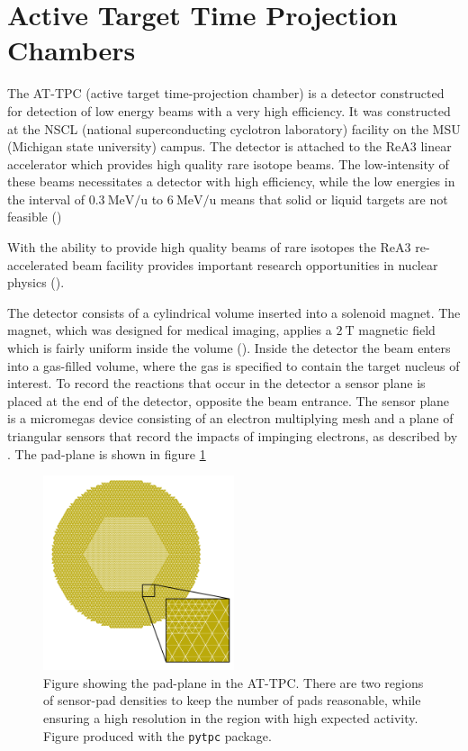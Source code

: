 \section{Active Target Time Projection Chambers}\label{sec:attpc}

The AT-TPC (active target time-projection chamber) is a detector constructed for detection of low energy beams with a very high efficiency. It was constructed at the NSCL (national superconducting cyclotron laboratory) facility on the MSU (Michigan state university) campus. The detector is attached to the ReA3 linear accelerator which provides high quality rare isotope beams. The low-intensity of these beams necessitates a detector with high efficiency, while the low energies in the interval of $\SI[per-mode=symbol]{0.3}{\MeV \per \atomicmassunit}$ to $\SI[per-mode=symbol]{6}{\MeV \per \atomicmassunit}$ means that solid or liquid targets are not feasible (\cite{Bradt2017a})

 With the ability to provide high quality beams of rare isotopes the ReA3 re-accelerated beam facility  provides important research opportunities in nuclear physics (\cite{Kester2010}). 

 The detector consists of a cylindrical volume inserted into a solenoid magnet. The magnet, which was designed for medical imaging, applies a $\SI{2}{\tesla}$ magnetic field which is fairly uniform inside the volume (\cite{Bradt2017a}). Inside the detector the beam enters into a gas-filled volume, where the gas is specified to contain the target nucleus of interest. To record the reactions that occur in the detector a sensor plane is placed at the end of the detector, opposite the beam entrance. The sensor plane is a micromegas device consisting of an electron multiplying mesh and a plane of triangular sensors that record the impacts of impinging electrons, as described by \citet{Giomataris1996}. The pad-plane is shown in figure \ref{fig:attpc_padplane}

 \begin{figure}
\centering
\includegraphics[width=0.5\textwidth]{../plots/at_tpc_padplane}
\caption{Figure showing the pad-plane in the AT-TPC. There are two regions of sensor-pad densities to keep the number of pads reasonable, while ensuring a high resolution in the region with high expected activity. Figure produced with the \lstinline{pytpc} package.}\label{fig:attpc_padplane}
 \end{figure}

